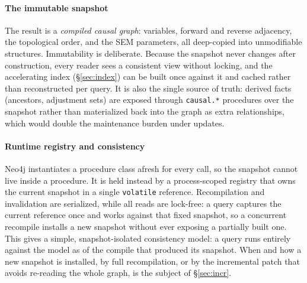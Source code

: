 \paragraph{The immutable snapshot}
The result is a \emph{compiled causal graph}: variables, forward and reverse
adjacency, the topological order, and the SEM parameters, all deep-copied into
unmodifiable structures. Immutability is deliberate. Because the snapshot never
changes after construction, every reader sees a consistent view without locking,
and the accelerating index (\S\ref{sec:index}) can be built once against it and
cached rather than reconstructed per query. It is also the single source of
truth: derived facts (ancestors, adjustment sets) are exposed through
\texttt{causal.*} procedures over the snapshot rather than materialized back into
the graph as extra relationships, which would double the maintenance burden
under updates.

\paragraph{Runtime registry and consistency}
Neo4j instantiates a procedure class afresh for every call, so the snapshot
cannot live inside a procedure. It is held instead by a process-scoped registry
that owns the current snapshot in a single \texttt{volatile} reference.
Recompilation and invalidation are serialized, while all reads are lock-free:
a query captures the current reference once and works against that fixed
snapshot, so a concurrent recompile installs a new snapshot without ever exposing
a partially built one. This gives a simple, snapshot-isolated consistency model:
a query runs entirely against the model as of the compile that produced its
snapshot. When and how a new snapshot is installed, by full recompilation, or by
the incremental patch that avoids re-reading the whole graph, is the subject of
\S\ref{sec:incr}.
